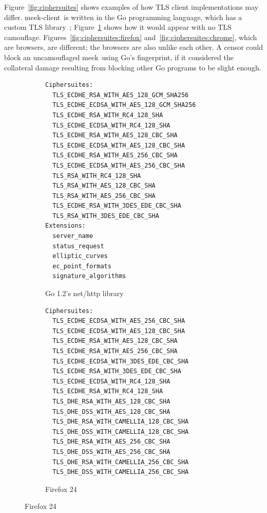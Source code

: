 \documentclass[conference]{IEEEtran}
\def\meekclient{\mbox{meek-client}}
\def\meek{meek}
\begin{document}
Figure~\ref{fig:ciphersuites} shows examples of how TLS client
implementations may differ.
\meekclient\ is written in the Go programming language,
which has a custom TLS library~\cite{golang-crypto/tls};
Figure~\ref{fig:ciphersuites:golang}
shows how it would appear with no TLS camouflage.
Figures~\ref{fig:ciphersuites:firefox} and~\ref{fig:ciphersuites:chrome},
which are browsers, are different; the browsers are also unlike each other.
A censor could block an uncamouflaged \meek\ using Go's fingerprint,
if it considered the collateral damage resulting from blocking other Go programs to be slight enough.

\begin{figure}
\centering
\begin{subfigure}[t]{0.30\textwidth}
\caption{Go 1.2's net/http library}
\begin{minipage}[t][25.5ex][t]{\textwidth}
\tiny
\begin{verbatim}
Ciphersuites:
  TLS_ECDHE_RSA_WITH_AES_128_GCM_SHA256
  TLS_ECDHE_ECDSA_WITH_AES_128_GCM_SHA256
  TLS_ECDHE_RSA_WITH_RC4_128_SHA
  TLS_ECDHE_ECDSA_WITH_RC4_128_SHA
  TLS_ECDHE_RSA_WITH_AES_128_CBC_SHA
  TLS_ECDHE_ECDSA_WITH_AES_128_CBC_SHA
  TLS_ECDHE_RSA_WITH_AES_256_CBC_SHA
  TLS_ECDHE_ECDSA_WITH_AES_256_CBC_SHA
  TLS_RSA_WITH_RC4_128_SHA
  TLS_RSA_WITH_AES_128_CBC_SHA
  TLS_RSA_WITH_AES_256_CBC_SHA
  TLS_ECDHE_RSA_WITH_3DES_EDE_CBC_SHA
  TLS_RSA_WITH_3DES_EDE_CBC_SHA
Extensions:
  server_name
  status_request
  elliptic_curves
  ec_point_formats
  signature_algorithms
\end{verbatim}
\end{minipage}
\label{fig:ciphersuites:golang}
\end{subfigure}
%
\begin{subfigure}[t]{0.30\textwidth}
\caption{Firefox 24}
\begin{minipage}[t][57ex][t]{\textwidth}
\tiny
\begin{verbatim}
Ciphersuites:
  TLS_ECDHE_ECDSA_WITH_AES_256_CBC_SHA
  TLS_ECDHE_ECDSA_WITH_AES_128_CBC_SHA
  TLS_ECDHE_RSA_WITH_AES_128_CBC_SHA
  TLS_ECDHE_RSA_WITH_AES_256_CBC_SHA
  TLS_ECDHE_ECDSA_WITH_3DES_EDE_CBC_SHA
  TLS_ECDHE_RSA_WITH_3DES_EDE_CBC_SHA
  TLS_ECDHE_ECDSA_WITH_RC4_128_SHA
  TLS_ECDHE_RSA_WITH_RC4_128_SHA
  TLS_DHE_RSA_WITH_AES_128_CBC_SHA
  TLS_DHE_DSS_WITH_AES_128_CBC_SHA
  TLS_DHE_RSA_WITH_CAMELLIA_128_CBC_SHA
  TLS_DHE_DSS_WITH_CAMELLIA_128_CBC_SHA
  TLS_DHE_RSA_WITH_AES_256_CBC_SHA
  TLS_DHE_DSS_WITH_AES_256_CBC_SHA
  TLS_DHE_RSA_WITH_CAMELLIA_256_CBC_SHA
  TLS_DHE_DSS_WITH_CAMELLIA_256_CBC_SHA

\end{verbatim}
\end{minipage}
\end{subfigure}
\end{figure}
\end{document}
